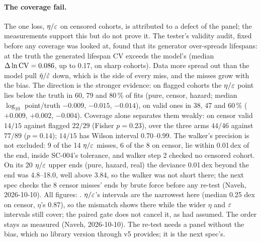 \paragraph{The coverage fail.} The one loss, $\eta/\varepsilon$ on censored cohorts, is attributed to a defect of the
panel; the measurements support this but do not prove it. The tester's validity audit, fixed before any coverage was
looked at, found that its generator over-spreads lifespans: at the truth the generated lifespan CV exceeds the model's
(median $\Delta\ln{\rm CV}=0.086$, up to 0.17, on sharp cohorts). Data more spread out than the model pull
$\hat\eta/\hat{\varepsilon}$ down, which is the side of every miss, and the misses grow with the bias. The direction is the
stronger evidence: on flagged cohorts the $\eta/\varepsilon$ point lies below the truth in 60, 79 and 80\,\% of fits
(pure, censor, hazard; median $\log_{10}$ point/truth $-0.009$, $-0.015$, $-0.014$), on valid ones in 38, 47 and
60\,\% ($+0.009$, $+0.002$, $-0.004$). Coverage alone separates them weakly: on censor valid $14/15$ against flagged
$22/29$ (Fisher $p=0.23$), over the three arms $44/46$ against $77/89$ ($p=0.14$); $14/15$ has Wilson interval
0.70--0.99. The walker's precision is not excluded: 9 of the 14 $\eta/\varepsilon$ misses, 6 of the 8 on censor, lie within
0.01\,dex of the end, inside SC-004's tolerance, and walker step 2 checked no censored cohort. On its 20 $\eta/\varepsilon$
upper ends (pure, hazard, real) the deviance 0.01\,dex beyond the end was 4.8--18.0, well above 3.84, so the walker
was not short there; the next spec checks the 8 censor misses' ends by brute force before any re-test (Naveh,
2026-10-10). All figures: . $\eta/\varepsilon$'s intervals are the narrowest here (median 0.25 dex on censor, $\eta$'s
0.87), so the mismatch shows there while the wider $\eta$ and $\varepsilon$ intervals still cover; the paired gate does not
cancel it, as  had assumed. The order stays as measured (Naveh, 2026-10-10). The re-test
needs a panel without the bias, which no library version through v5 provides; it is the next spec's.
